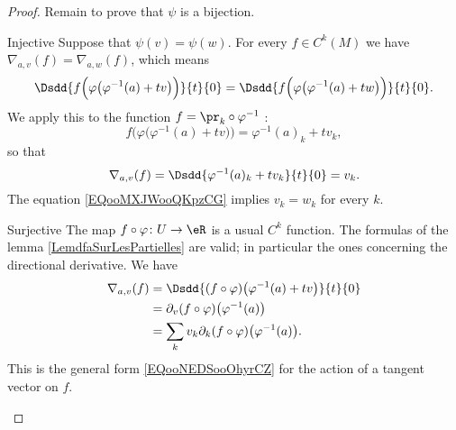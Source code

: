 \begin{proof}
    Remain to prove that \( \psi\) is a bijection.
    \begin{subproof}
        \item[Injective]
            Suppose that \( \psi(v)=\psi(w)\). For every \( f\in C^k(M)\) we have \( \nabla_{a,v}(f)=\nabla_{a,w}(f)\), which means
            \begin{equation}        \label{EQooMXJWooQKpzCG}
                \Dsdd{ f\Big( \varphi\big( \varphi^{-1}(a)+tv \big) \Big) }{t}{0}=\Dsdd{ f\Big( \varphi\big( \varphi^{-1}(a)+tw \big) \Big) }{t}{0}.
            \end{equation}
            We apply this to the function \( f=\pr_k\circ\varphi^{-1}\) :
            \begin{equation}
                f\Big( \varphi\big( \varphi^{-1}(a)+tv \big) \Big)=\varphi^{-1}(a)_k+tv_k,
            \end{equation}
            so that
            \begin{equation}
                \nabla_{a,v}(f)=\Dsdd{ \varphi^{-1}(a)_k+tv_k }{t}{0}=v_k.
            \end{equation}
            The equation \eqref{EQooMXJWooQKpzCG} implies \( v_k=w_k\) for every \( k\).
        \item[Surjective]
            The map \( f\circ \varphi\colon U \to \eR \) is a usual \( C^k\) function. The formulas of the lemma \ref{LemdfaSurLesPartielles} are valid; in particular the ones concerning the directional derivative. We have
            \begin{subequations}
                \begin{align}
                    \nabla_{a,v}(f)&=\Dsdd{ (f\circ \varphi)\big( \varphi^{-1}(a)+tv \big) }{t}{0}\\
                    &=\partial_v(f\circ \varphi)\big( \varphi^{-1}(a) \big)\\
                    &=\sum_k v_k\partial_k(f\circ\varphi)\big( \varphi^{-1}(a) \big).
                \end{align}
            \end{subequations}
            This is the general form \eqref{EQooNEDSooOhyrCZ} for the action of a tangent vector on \( f\).
    \end{subproof}
\end{proof}

